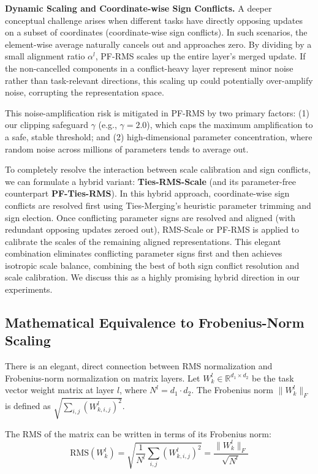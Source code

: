 \textbf{Dynamic Scaling and Coordinate-wise Sign Conflicts.}
A deeper conceptual challenge arises when different tasks have directly opposing updates on a subset of coordinates (coordinate-wise sign conflicts). In such scenarios, the element-wise average naturally cancels out and approaches zero. By dividing by a small alignment ratio $\alpha^l$, PF-RMS scales up the entire layer's merged update. If the non-cancelled components in a conflict-heavy layer represent minor noise rather than task-relevant directions, this scaling up could potentially over-amplify noise, corrupting the representation space. 

This noise-amplification risk is mitigated in PF-RMS by two primary factors: (1) our clipping safeguard $\gamma$ (e.g., $\gamma = 2.0$), which caps the maximum amplification to a safe, stable threshold; and (2) high-dimensional parameter concentration, where random noise across millions of parameters tends to average out. 

To completely resolve the interaction between scale calibration and sign conflicts, we can formulate a hybrid variant: \textbf{Ties-RMS-Scale} (and its parameter-free counterpart \textbf{PF-Ties-RMS}). In this hybrid approach, coordinate-wise sign conflicts are resolved first using Ties-Merging's heuristic parameter trimming and sign election. Once conflicting parameter signs are resolved and aligned (with redundant opposing updates zeroed out), RMS-Scale or PF-RMS is applied to calibrate the scales of the remaining aligned representations. This elegant combination eliminates conflicting parameter signs first and then achieves isotropic scale balance, combining the best of both sign conflict resolution and scale calibration. We discuss this as a highly promising hybrid direction in our experiments.

\subsection{Mathematical Equivalence to Frobenius-Norm Scaling}
There is an elegant, direct connection between RMS normalization and Frobenius-norm normalization on matrix layers. Let $W_k^l \in \mathbb{R}^{d_1 \times d_2}$ be the task vector weight matrix at layer $l$, where $N^l = d_1 \cdot d_2$. The Frobenius norm $\| W_k^l \|_F$ is defined as $\sqrt{\sum_{i,j} (W_{k,i,j}^l)^2}$. 

The RMS of the matrix can be written in terms of its Frobenius norm:
\begin{equation}
\text{RMS}(W_k^l) = \sqrt{\frac{1}{N^l} \sum_{i,j} (W_{k, i, j}^l)^2} = \frac{\| W_k^l \|_F}{\sqrt{N^l}}
\end{equation}

